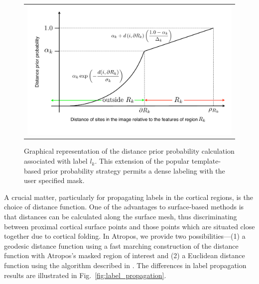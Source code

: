 \documentclass[11pt,english]{article}
\begin{document}
\begin{figure}
\begin{center}
\begin{tabular}{c}
\includegraphics[width=150mm]{distancePrior.pdf}
\end{tabular}
\caption{\baselineskip 12pt \small Graphical representation of the distance prior probability calculation associated with label $l_k$.  This extension of the popular template-based prior probability strategy permits a dense labeling with the user specified mask. }
\label{fig:distancePrior}
\end{center}
\end{figure}



A crucial matter, particularly for propagating labels in the cortical
regions, is the choice of distance function.  One of the advantages to
surface-based methods is that distances can be calculated along the
surface mesh, thus discriminating between proximal cortical surface
points and those points which are situated close together due to
cortical folding.  In Atropos, we provide two possibilities---(1) a
geodesic distance function using a fast marching construction
\citep{Osher1988} of the distance function with Atropos's masked
region of interest and (2) a Euclidean distance function using the algorithm described in \cite{Maurer2003}.  The differences in label propagation results are illustrated in Fig.~\ref{fig:label_propagation}.   
\end{document}
